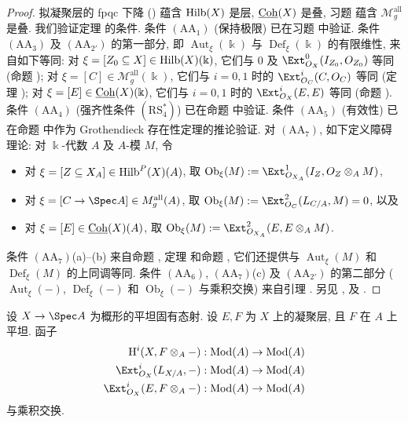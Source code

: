 \begin{proof}
拟凝聚层的 fpqc 下降 () 蕴含 $\operatorname{Hilb}(X)$ 是层, $\underline{\mathrm{Coh}}(X)$ 是叠, 习题  蕴含 $\mathcal M_g^{\mathrm{all}}$ 是叠. 我们验证定理  的条件. 条件 $(\mathrm{AA}_1)$ (保持极限) 已在习题  中验证. 条件 $(\mathrm{AA}_3)$ 及 $(\mathrm{AA}_{2'})$ 的第一部分, 即 $\operatorname{Aut}_{\xi}(\Bbbk)$ 与 $\operatorname{Def}_{\xi}(\Bbbk)$ 的有限维性, 来自如下等同: 对 $\xi=[Z_0\subseteq X]\in\operatorname{Hilb}(X)(\Bbbk)$, 它们与 $0$ 及 $\Ext^0_{\mathcal O_X}(I_{Z_0},\mathcal O_{Z_0})$ 等同 (命题 ); 对 $\xi=[C]\in\mathcal M_g^{\mathrm{all}}(\Bbbk)$, 它们与 $i=0,1$ 时的 $\Ext^i_{\mathcal O_C}(C,\mathcal O_C)$ 等同 (定理 ); 对 $\xi=[E]\in\underline{\mathrm{Coh}}(X)(\Bbbk)$, 它们与 $i=0,1$ 时的 $\Ext^i_{\mathcal O_X}(E,E)$ 等同 (命题 ). 条件 $(\mathrm{AA}_4)$ (强齐性条件 $(\mathrm{RS}_4^*)$) 已在命题  中验证. 条件 $(\mathrm{AA}_5)$ (有效性) 已在命题  中作为 Grothendieck 存在性定理的推论验证. 对 $(\mathrm{AA}_7)$, 如下定义障碍理论: 对 $\Bbbk$-代数 $A$ 及 $A$-模 $M$, 令
\begin{itemize}
\item 对 $\xi=[Z\subseteq X_A]\in\operatorname{Hilb}^P(X)(A)$, 取 $\operatorname{Ob}_{\xi}(M):=\Ext^1_{\mathcal O_{X_A}}(I_Z,\mathcal O_Z\otimes_AM)$,
\item 对 $\xi=[\mathcal C\to\Spec A]\in\mathcal M_g^{\mathrm{all}}(A)$, 取 $\operatorname{Ob}_{\xi}(M):=\Ext^2_{\mathcal O_{\mathcal C}}(L_{\mathcal C/A},M)=0$, 以及
\item 对 $\xi=[E]\in\underline{\mathrm{Coh}}(X)(A)$, 取 $\operatorname{Ob}_{\xi}(M):=\Ext^2_{\mathcal O_{X_A}}(E,E\otimes_AM)$.
\end{itemize}
条件 $(\mathrm{AA}_7)$(a)--(b) 来自命题 , 定理  和命题 , 它们还提供与 $\operatorname{Aut}_{\xi}(M)$ 和 $\operatorname{Def}_{\xi}(M)$ 的上同调等同. 条件 $(\mathrm{AA}_6)$, $(\mathrm{AA}_7)$(c) 及 $(\mathrm{AA}_{2'})$ 的第二部分 ($\operatorname{Aut}_{\xi}(-)$, $\operatorname{Def}_{\xi}(-)$ 和 $\operatorname{Ob}_{\xi}(-)$ 与乘积交换) 来自引理 . 另见 \cite[推论 $6.2$]{Art69b}, \cite[定理 $2.11$]{Lie06b} 及 \cite[Tags 09TU, 0D5A 和 08KA]{SP}.
\end{proof}
\begin{lemma}\label{src:C.7.8}
设 $X\to\Spec A$ 为概形的平坦固有态射. 设 $E,F$ 为 $X$ 上的凝聚层, 且 $F$ 在 $A$ 上平坦. 函子
\[
\begin{aligned}
\mathrm H^i(X,F\otimes_A-)&:\operatorname{Mod}(A)\to\operatorname{Mod}(A)\\
\Ext^i_{\mathcal O_X}(L_{X/A},-)&:\operatorname{Mod}(A)\to\operatorname{Mod}(A)\\
\Ext^i_{\mathcal O_X}(E,F\otimes_A-)&:\operatorname{Mod}(A)\to\operatorname{Mod}(A)
\end{aligned}
\]
与乘积交换.
\end{lemma}
